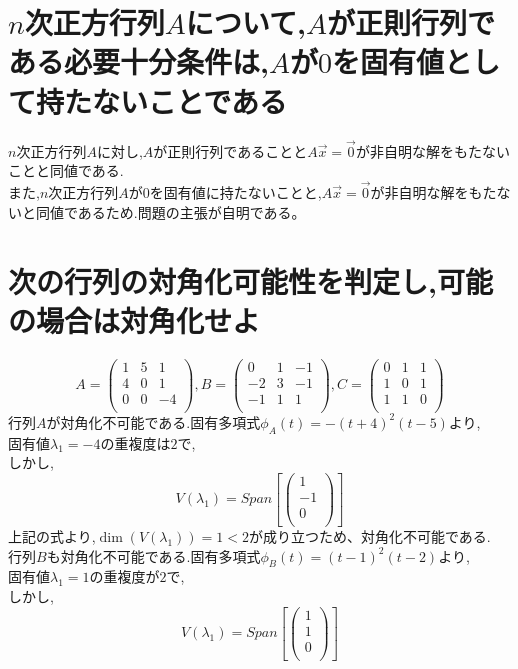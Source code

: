 \documentclass{jreport}
\begin{document}
\section{$n$次正方行列$A$について,$A$が正則行列である必要十分条件は,$A$が$0$を固有値として持たないことである}
$n$次正方行列$A$に対し,$A$が正則行列であることと$A\vec{x}=\vec{0}$が非自明な解をもたないことと同値である.\\
また,$n$次正方行列$A$が$0$を固有値に持たないことと,$A\vec{x}=\vec{0}$が非自明な解をもたないと同値であるため.問題の主張が自明である。
\section{次の行列の対角化可能性を判定し,可能の場合は対角化せよ}
$$
A=
\left(
\begin{array}{ccc}
	1 & 5 & 1\\
	4 & 0 & 1\\
	0 & 0 &-4\\
\end{array}
\right)
,
B=
\left(
\begin{array}{ccc}
        0 & 1 &-1\\
       -2 & 3 &-1\\
       -1 & 1 & 1\\
\end{array}
\right)
,
C=
\left(
\begin{array}{ccc}
        0 & 1 & 1\\
        1 & 0 & 1\\
        1 & 1 & 0\\
\end{array}
\right)
$$
行列$A$が対角化不可能である.固有多項式$\phi_A(t)=-(t+4)^2(t-5)$より,\\
固有値$\lambda_1 =-4$の重複度は$2$で,\\
しかし,
$$
V(\lambda_1) =Span[\left(
			\begin{array}{c}
				1\\
				-1\\
				0\\
			\end{array}
			\right)
			]
$$
上記の式より,$\dim(V(\lambda_1)) =1 <2$が成り立つため、対角化不可能である.\\
行列$B$も対角化不可能である.固有多項式$\phi_B(t)= (t-1)^2(t-2)$より,\\
固有値$\lambda_1 =1$の重複度が$2$で,\\
しかし,
$$
V(\lambda_1) =Span[\left(
                        \begin{array}{c}
                                1\\
                                 1\\
                                0\\
                        \end{array}
                        \right)
                        ]
$$
\end{document}
